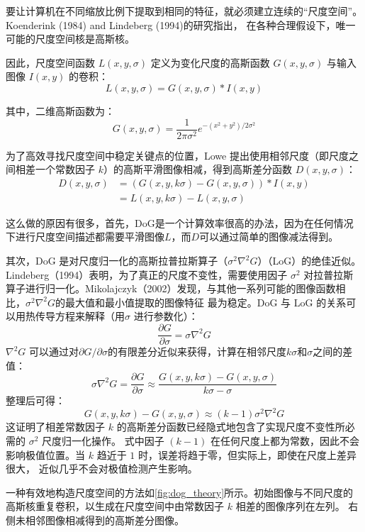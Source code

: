 \documentclass[12pt,hyperref,a4paper,UTF8]{ctexart}
\begin{document}
要让计算机在不同缩放比例下提取到相同的特征，就必须建立连续的“尺度空间”。Koenderink (1984) and Lindeberg (1994)的研究指出，
在各种合理假设下，唯一可能的尺度空间核是高斯核。

因此，尺度空间函数 $L(x,y,\sigma)$ 定义为变化尺度的高斯函数 $G(x,y,\sigma)$ 与输入图像 $I(x,y)$ 的卷积：
\begin{equation}
    L(x,y,\sigma) = G(x,y,\sigma) * I(x,y)
\end{equation}

其中，二维高斯函数为：
$$G(x,y,\sigma) = \frac{1}{2\pi\sigma^2} e^{-(x^2+y^2)/2\sigma^2}$$

为了高效寻找尺度空间中稳定关键点的位置，Lowe 提出使用相邻尺度（即尺度之间相差一个常数因子 $k$）的高斯平滑图像相减，得到高斯差分函数 $D(x,y,\sigma)$：
\begin{align*}
    D(x,y,\sigma) & = (G(x,y,k\sigma) - G(x,y,\sigma)) * I(x,y) \\
                  & = L(x,y,k\sigma) - L(x,y,\sigma)
\end{align*}

这么做的原因有很多，首先，DoG是一个计算效率很高的办法，因为在任何情况下进行尺度空间描述都需要平滑图像$L$，而$D$可以通过简单的图像减法得到。

其次，DoG 是对尺度归一化的高斯拉普拉斯算子（$\sigma^2\nabla^2G$）（LoG）的绝佳近似。Lindeberg（1994）表明，为了真正的尺度不变性，需要使用因子
$\sigma^2$ 对拉普拉斯算子进行归一化。Mikolajczyk（2002）发现，与其他一系列可能的图像函数相比，$\sigma^2\nabla^2G$的最大值和最小值提取的图像特征
最为稳定。DoG 与 LoG 的关系可以用热传导方程来解释（用$\sigma$ 进行参数化）：
$$\frac{\partial G}{\partial \sigma} = \sigma\nabla^2G$$
$\nabla^2G$ 可以通过对$\partial G / \partial \sigma$的有限差分近似来获得，计算在相邻尺度$k\sigma$和$\sigma$之间的差值：
$$\sigma\nabla^2G = \frac{\partial G}{\partial \sigma} \approx \frac{G(x,y,k\sigma) - G(x,y,\sigma)}{k\sigma - \sigma}$$
整理后可得：
\begin{equation}
    G(x,y,k\sigma) - G(x,y,\sigma) \approx (k-1)\sigma^2\nabla^2G
\end{equation}
这证明了相差常数因子 $k$ 的高斯差分函数已经隐式地包含了实现尺度不变性所必需的 $\sigma^2$ 尺度归一化操作。
式中因子 $(k-1)$ 在任何尺度上都为常数，因此不会影响极值位置。当 $k$ 趋近于 $1$ 时，误差将趋于零，但实际上，即使在尺度上差异很大，
近似几乎不会对极值检测产生影响。

一种有效地构造尺度空间的方法如\autoref{fig:dog_theory}所示。初始图像与不同尺度的高斯核重复卷积，以生成在尺度空间中由常数因子 $k$ 相差的图像序列在左列。
右侧未相邻图像相减得到的高斯差分图像。
\end{document}
